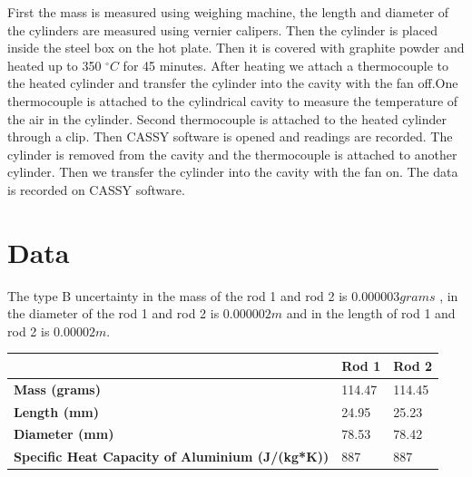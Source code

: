 First the mass is measured using weighing machine, the length and diameter of the cylinders are measured using vernier calipers. Then the cylinder is placed inside the steel box on the hot plate. Then it is covered with graphite powder and heated up to 350 $^{\circ} C$  for 45 minutes.  After heating we attach a thermocouple to the heated cylinder and transfer the cylinder into the cavity with the fan off.One thermocouple is attached to the cylindrical cavity to measure the temperature of the air in the cylinder. Second thermocouple is attached to the heated cylinder through a clip.  Then CASSY software is opened and readings are recorded. The cylinder is removed from the cavity and the thermocouple is attached to another cylinder. Then we transfer the cylinder into the cavity with the fan on. The data is recorded on CASSY software. 



\section{Data}
The type B uncertainty in the mass of the rod 1 and rod 2 is $0.000003 grams$ , in the diameter of the rod 1 and rod 2 is $0.000002m$ and in the length of rod 1 and rod 2 is $0.00002m$. 

\begin{center}

\begin{tabular}{|l|l|l|}
\hline
\textbf{}                                               & \textbf{Rod 1} & \textbf{Rod 2} \\ \hline
\textbf{Mass (grams)}                                   & 114.47         & 114.45         \\ \hline
\textbf{Length (mm)}                                    & 24.95          & 25.23          \\ \hline
\textbf{Diameter  (mm)}                                 & 78.53          & 78.42          \\ \hline
\textbf{Specific Heat Capacity of Aluminium (J/(kg*K))} & 887            & 887            \\ \hline
\end{tabular}
\end{center}

